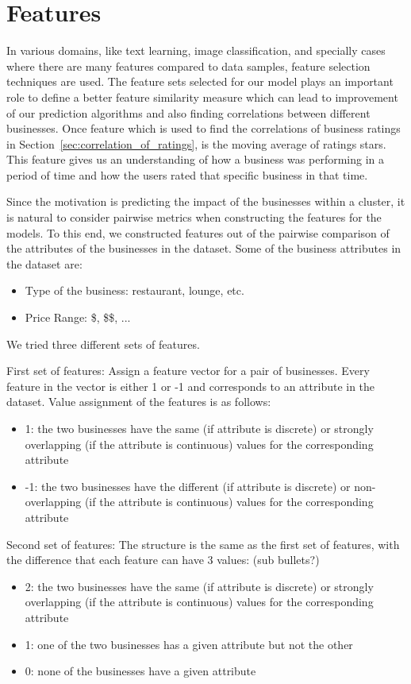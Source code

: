 \documentclass{vldb}
\begin{document}
\section{Features}
In various domains, like text learning, image classification, and specially cases where there are many features compared to data samples, feature selection techniques are used. The feature sets selected for our model plays an important role to define a better feature similarity measure which can lead to improvement of our prediction algorithms and also finding correlations between different businesses.
Once feature which is used to find the correlations of business ratings in Section~\ref{sec:correlation_of_ratings}, is the moving average of ratings stars. This feature gives us an understanding of how a business was performing in a period of time and how the users rated that specific business in that time.

Since the motivation is predicting the impact of the businesses within a cluster, it is natural to consider pairwise metrics when constructing the features for the models. To this end, we constructed features out of the pairwise comparison of the attributes of the businesses in the dataset. Some of the business attributes in the dataset are:
\begin{itemize}
  \item Type of the business: restaurant, lounge, etc.
  \item Price Range: \$, \$\$, ...
\end{itemize}

We tried three different sets of features.

First set of features: Assign a feature vector for a pair of businesses. Every feature in the vector is either 1 or -1 and corresponds to an attribute in the dataset. Value assignment of the features is as follows:
\begin{itemize}
\item 1: the two businesses have the same (if attribute is discrete) or strongly overlapping (if the attribute is continuous) values for the corresponding attribute
\item -1: the two businesses have the different (if attribute is discrete) or non-overlapping (if the attribute is continuous) values for the corresponding attribute
\end{itemize}

Second set of features: The structure is the same as the first set of features, with the difference that each feature can have 3 values:
(sub bullets?)
\begin{itemize}
\item 2: the two businesses have the same (if attribute is discrete) or strongly overlapping (if the attribute is continuous) values for the corresponding attribute
\item 1: one of the two businesses has a given attribute but not the other
\item 0: none of the businesses have a given attribute
\end{itemize}
\end{document}
